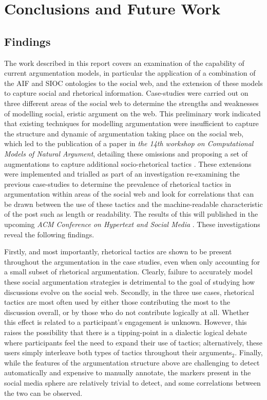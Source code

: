 

\chapter{Conclusions and Future Work}
\label{conclusionsfuture}

\section{Findings}
\label{conclusionsfuture:findings}
The work described in this report covers an examination of the capability of current argumentation models, in particular the application of a combination of the AIF and SIOC ontologies to the social web, and the extension of these models to capture social and rhetorical information. Case-studies were carried out on three different areas of the social web to determine the strengths and weaknesses of modelling social, eristic argument on the web. This preliminary work indicated that existing techniques for modelling argumentation were insufficient to capture the structure and dynamic of argumentation taking place on the social web, which led to the publication of a paper in \textit{the 14th workshop on Computational Models of Natural Argument}, detailing these omissions and proposing a set of augmentations to capture additional socio-rhetorical tactics \citep{Blount2014}. These extensions were implemented and trialled as part of an investigation re-examining the previous case-studies to determine the prevalence of rhetorical tactics in argumentation within areas of the social web and look for correlations that can be drawn between the use of these tactics and the machine-readable characteristic of the post such as length or readability. The results of this will published in the upcoming \textit{ACM Conference on Hypertext and Social Media} \citep{Blount2015}. These investigations reveal the following findings.

Firstly, and most importantly, rhetorical tactics are shown to be present throughout the argumentation in the case studies, even when only accounting for a small subset of rhetorical argumentation. Clearly, failure to accurately model these social argumentation strategies is detrimental to the goal of studying how discussions evolve on the social web. Secondly, in the three use cases, rhetorical tactics are most often used by either those contributing the most to the discussion overall, or by those who do not contribute logically at all. Whether this effect is related to a participant's engagement is unknown. However, this raises the possibility that there is a tipping-point in a dialectic logical debate where participants feel the need to expand their use of tactics; alternatively, these users simply interleave both types of tactics throughout their arguments$_2$. Finally, while the features of the argumentation structure above are challenging to detect automatically and expensive to manually annotate, the markers present in the social media sphere are relatively trivial to detect, and some correlations between the two can be observed.

